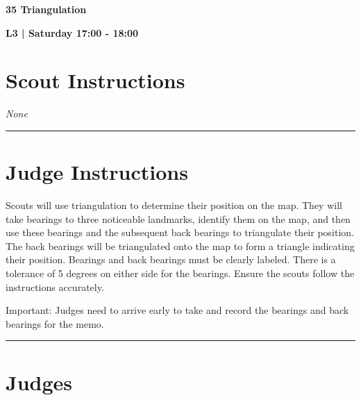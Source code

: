 \documentclass[10pt]{article}
\newcommand{\newtitle}[1]{\begin{center}{\Huge\bfseries #1 }\\ \vspace{5mm}\end{center}}
\newcommand{\newsubtitle}[1]{\begin{center}{\color{grey}\Large\bfseries #1 }\\ \vspace{5mm}\end{center}}
\begin{document}
	\vspace{1cm}


	\clearpage
		\newtitle{35 Triangulation }
	\newsubtitle{L3 | Saturday 17:00 - 18:00}
		\setcounter{section}{34}
	\section*{Scout Instructions}
		\textit{None}
	
	\vspace{0.5cm}
	\hrule
	\vspace{0.5cm}

		\section*{Judge Instructions}
		Scouts will use triangulation to determine their position on the map. They will take bearings to three noticeable landmarks, identify them on the map, and then use these bearings and the subsequent back bearings to triangulate their position. The back bearings will be triangulated onto the map to form a triangle indicating their position. Bearings and back bearings must be clearly labeled. There is a tolerance of 5 degrees on either side for the bearings. Ensure the scouts follow the instructions accurately.



Important: Judges need to arrive early to take and record the bearings and back bearings for the memo. 


\vspace{0.5cm}
	\hrule
	\vspace{0.5cm}
		\section*{\faUsers \: Judges}

		
\end{document}
